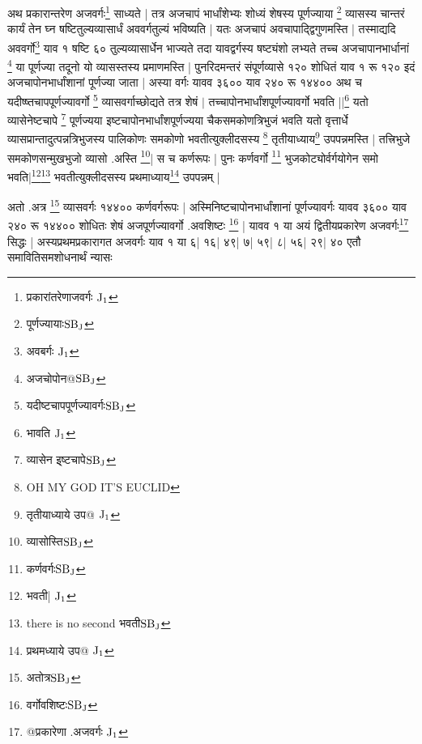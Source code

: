 \documentclass[12pt]{article}
\begin{document}
{अथ
प्रकारान्तरेण अजवर्गः\footnote{{\s प्रकारांतरेणाजवर्गः }${\rm J_1}$}
साध्यते |
तत्र अजचापं भार्धांशेभ्यः शोध्यं शेषस्य
पूर्णज्याया \footnote{{\s पूर्णज्यायाः}${\rm SB_J}$} व्यासस्य चान्तरं कार्यं तेन घ्न षष्टितुल्यव्यासार्धं
अववर्गतुल्यं भविष्यति |
यतः अजचापं अवचापाद्द्विगुणमस्ति |
तस्माद्यदि अववर्गो\footnote{{\s अवबर्गः} ${\rm J_1}$}
याव १ षष्टि ६० तुल्यव्यासार्धेन भाज्यते तदा यावद्वर्गस्य
षष्ट्यंशो लभ्यते तच्च अजचापानभार्धानां \footnote{{\s अजचोपोन@}${\rm SB_J}$} या पूर्णज्या
तदूनो यो व्यासस्तस्य प्रमाणमस्ति |
पुनरिदमन्तरं संपूर्णव्यासे १२० शोधितं
याव १  रू १२०
इदं अजचापोनभार्धांशानां पूर्णज्या जाता |
अस्या वर्गः %
यावव ३६०० याव २४०
रू १४४००
अथ च यदीष्ष्तचापपूर्णज्यावर्गो \footnote{{\s यदीष्टचापपूर्णज्यावर्गः}${\rm SB_J}$} व्यासवर्गाच्छोद्यते
तत्र शेषं
$|$
तच्चापोनभार्धांशपूर्णज्यावर्गो
भवति ||\footnote{{\s भावति }${\rm J_1}$}
यतो व्यासेनेष्टचापे \footnote{{\s व्यासेन इ्ष्टचापे}${\rm SB_J}$} पूर्णज्यया इष्टचापोनभार्धांशपूर्णज्यया
चैकसमकोणत्रि\-भुजं भवति यतो वृत्तार्धे व्यासप्रान्तादुत्पन्नत्रिभुजस्य
पालिकोणः समकोणो
भवतीत्युक्लीदसस्य \footnote{OH MY GOD IT'S EUCLID}
तृतीयाध्याय\footnote{{\s तृतीयाध्याये उप@ }${\rm J_1}$}
उपपन्न\-मस्ति |
तत्त्रिभुजे
समकोणसन्मुखभुजो व्यासो .अस्ति \footnote{{\s व्यासोस्ति}${\rm SB_J}$}|
स च कर्णरूपः |
पुनः कर्णवर्गो \footnote{{\s कर्णवर्गः}${\rm SB_J}$} भुजकोट्योर्वर्गयोगेन समो
भवति|\footnote{{\s भवती| }${\rm J_1}$}\footnote{{there is no second भवती}${\rm SB_J}$}
भवतीत्युक्लीदसस्य
प्रथमाध्याय\footnote{{\s प्रथमध्याये उप@ }${\rm J_1}$}
उपपन्नम् |

अतो .अत्र \footnote{{\s अतोत्र}${\rm SB_J}$} व्यासवर्गः १४४०० कर्णवर्गरूपः |
अस्मिनिष्टचापोनभार्धांशानां पूर्णज्यावर्गः
यावव ३६०० याव २४०
रू १४४००
शोधितः शेषं अजपूर्णज्यावर्गो .अवशिष्टः \footnote{{\s वर्गोवशिष्टः}${\rm SB_J}$} |
यावव %
१  या  
अयं
द्वितीयप्रकारेण अजवर्गः\footnote{{\s @प्रकारेणा .अजवर्गः }${\rm J_1}$}
सिद्धः |
अस्यप्रथमप्रकारागत अजवर्गः याव १ या ६| १६| ४९| ७| ५९| ८| ५६| २९| ४०
एतौ समावितिसमशोधनार्थं न्यासः

}
\end{document}
